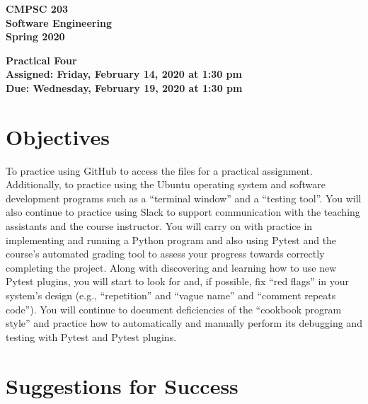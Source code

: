 \documentclass[11pt]{article}
\newcommand{\assignmentduedate}{February 19}
\newcommand{\assignmentassignedate}{February 14}
\newcommand{\assignmentnumber}{Four}
\newcommand{\labyear}{2020}
\newcommand{\labdueday}{Wednesday}
\newcommand{\labassignday}{Friday}
\newcommand{\labtime}{1:30 pm}
\newcommand{\assigneddate}{Assigned: \labassignday, \assignmentassignedate, \labyear{} at \labtime{}}
\newcommand{\duedate}{Due: \labdueday, \assignmentduedate, \labyear{} at \labtime{}}
\newcommand{\labtitle}[1]
{
  \begin{center}
    \begin{center}
      \bf
      CMPSC 203\\Software Engineering\\
      Spring 2020\\
      \medskip
    \end{center}
    \bf
    #1
  \end{center}
}
\begin{document}
\thispagestyle{empty}

\labtitle{Practical \assignmentnumber{} \\ \assigneddate{} \\ \duedate{}}

\section*{Objectives}

To practice using GitHub to access the files for a practical assignment.
Additionally, to practice using the Ubuntu operating system and software
development programs such as a ``terminal window'' and a ``testing tool''. You
will also continue to practice using Slack to support communication with the
teaching assistants and the course instructor. You will carry on with practice
in implementing and running a Python program and also using Pytest and the
course's automated grading tool to assess your progress towards correctly
completing the project. Along with discovering and learning how to use new
Pytest plugins, you will start to look for and, if possible, fix ``red flags''
in your system's design (e.g., ``repetition'' and ``vague name'' and ``comment
repeats code''). You will continue to document deficiencies of the ``cookbook
program style'' and practice how to automatically and manually perform its
debugging and testing with Pytest and Pytest plugins.

\section*{Suggestions for Success}
\end{document}
